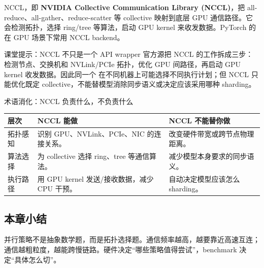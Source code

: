 NCCL，即 \textbf{NVIDIA Collective Communication Library (NCCL)}，把 all-reduce、all-gather、reduce-scatter 等 collective 映射到底层 GPU 通信路径。它会检测拓扑，选择 ring/tree 等算法，启动 GPU kernel 来收发数据。PyTorch 的  在 GPU 场景下常用 NCCL backend。

\begin{knowledgebox}{课堂提示：NCCL 不只是一个 API wrapper}
官方源把 NCCL 的工作拆成三步：检测节点、交换机和 NVLink/PCIe 拓扑，优化 GPU 间路径，再启动 GPU kernel 收发数据。因此同一个  在不同机器上可能选择不同执行计划；但 NCCL 只能优化既定 collective，不能替模型消除同步语义或决定应该采用哪种 sharding。
\end{knowledgebox}

\begin{knowledgebox}{术语消化：NCCL 负责什么，不负责什么}
\begin{tabular}{L{0.22\textwidth}L{0.34\textwidth}L{0.34\textwidth}}
\toprule
层次 & NCCL 能做 & NCCL 不能替你做 \\
\midrule
拓扑感知 & 识别 GPU、NVLink、PCIe、NIC 的连接关系。 & 改变硬件带宽或跨节点物理距离。 \\
算法选择 & 为 collective 选择 ring、tree 等通信算法。 & 减少模型本身要求的同步语义。 \\
执行路径 & 用 GPU kernel 发送/接收数据，减少 CPU 干预。 & 自动决定模型应该怎么 sharding。 \\
\bottomrule
\end{tabular}
\end{knowledgebox}

\subsection{本章小结}

并行策略不是抽象数学题，而是拓扑选择题。通信频率越高，越要靠近高速互连；通信越粗粒度，越能跨慢链路。硬件决定“哪些策略值得尝试”，benchmark 决定“具体怎么切”。

